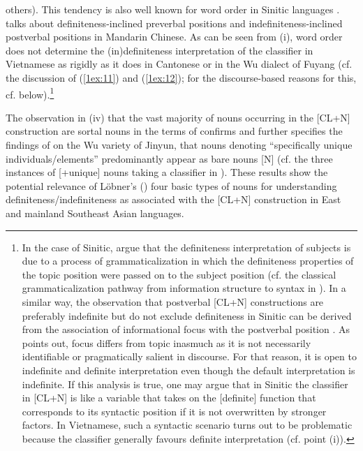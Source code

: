\documentclass[output=paper]{langsci/langscibook}
\begin{document}
others). This tendency is also well known for word order in Sinitic languages  \citep{li:thompson:76,sun:givon:85,lapolla:95}. \cite[][1166]{chen:04} talks about definiteness-inclined preverbal positions and indefiniteness-inclined postverbal positions in Mandarin Chinese. As can be seen from (i), word order does not determine the (in)definiteness interpretation of the classifier in Vietnamese as rigidly as it does in Cantonese or in the Wu dialect of Fuyang (cf. the discussion of (\ref{1ex:11}) and (\ref{1ex:12}); for the discourse-based reasons for this, cf. below).\footnote{In the case of Sinitic, \cite{li:bisang:12} argue that the definiteness interpretation of subjects is due to a process of grammaticalization in which the definiteness properties of the topic position were passed on to the subject position (cf. the classical grammaticalization pathway from information structure to syntax in \citealt{givon:79}). In a similar way, the observation that postverbal [CL+N] constructions are preferably indefinite but do not exclude definiteness in Sinitic  can be derived from the association of informational focus with the postverbal position \citep{xu:04}. As \cite[][262]{lambrecht:94} points out, focus differs from topic inasmuch as it is not necessarily identifiable or pragmatically salient in discourse. For that reason, it is open to indefinite and definite interpretation even though the default interpretation is indefinite. If this analysis is true, one may argue that in Sinitic  the classifier in [CL+N] is like a variable that takes on the [\pm definite] function that corresponds to its syntactic position if it is not overwritten by stronger factors. In Vietnamese, such a syntactic scenario turns out to be problematic because the classifier generally favours definite interpretation (cf. point (i)).}

{
The observation in (iv) that the vast majority of nouns occurring in the [CL+N] construction are sortal nouns in the terms of \cite{lobner:85} confirms and further specifies the findings of \cite[][324]{simpson:17} on the Wu variety of Jinyun, that nouns denoting ``specifically unique individuals/elements'' predominantly appear as bare nouns [N] (cf. the three instances of [+unique] nouns taking a classifier in ). These results show the potential relevance of L\"obner's (\citeyear{lobner:85,lobner:11}) four basic types of nouns for understanding definiteness/indefiniteness as associated with the [CL+N] construction in East  and mainland Southeast Asian languages.
}
\end{document}
